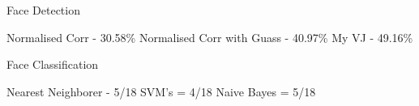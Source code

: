 

Face Detection

Normalised Corr - 30.58\%
Normalised Corr with Guass - 40.97\%
My VJ - 49.16\%

Face Classification

Nearest Neighborer - 5/18
SVM's = 4/18
Naive Bayes = 5/18

